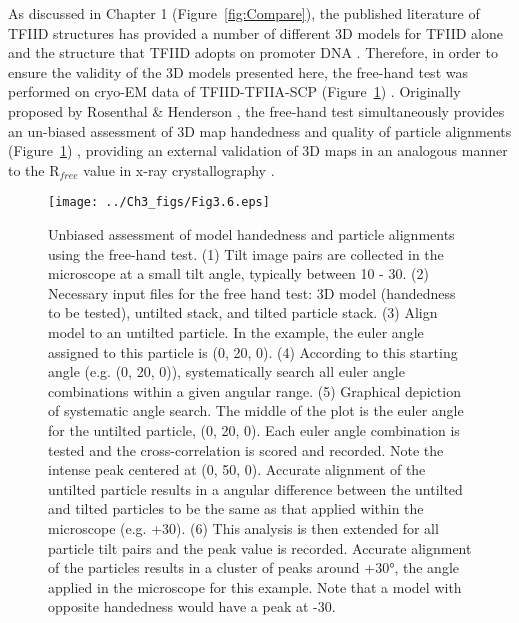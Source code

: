 As discussed in Chapter 1 (Figure~\ref{fig:Compare}), the published literature of TFIID structures has provided a number of different 3D models for TFIID alone \cite{Elmlund_691,Leurent_1554,Leurent_1797,Papai_539} and the structure that TFIID adopts on promoter DNA \cite{Elmlund_691,Papai_418}. Therefore, in order to ensure the validity of the 3D models presented here, the free-hand test was performed on cryo-EM data of TFIID-TFIIA-SCP  (Figure~\ref{fig:Fig3.6}) \cite{Rosenthal_2003}. Originally proposed by Rosenthal \& Henderson \cite{Rosenthal_2003}, the free-hand test simultaneously provides an un-biased assessment of 3D map handedness and quality of particle alignments (Figure~\ref{fig:Fig3.6}) \cite{Baker_2012,Henderson_2011,Lau_2010,Rosenthal_2003}, providing an external validation of 3D maps in an analogous manner to the R$_{free}$ value in x-ray crystallography \cite{Brunger_1992}. \\
\begin{figure}
\centering
\texttt{[image: ../Ch3\_figs/Fig3.6.eps]}
\caption[Unbiased assessment of model handedness and particle alignments using the free-hand test]{Unbiased assessment of model handedness and particle alignments using the free-hand test. (1) Tilt image pairs are collected in the microscope at a small tilt angle, typically between 10 - 30\textdegree. (2) Necessary input files for the free hand test:  3D model (handedness to be tested), untilted stack, and tilted particle stack. (3) Align model to an untilted particle.  In the example, the euler angle assigned to this particle is (0, 20, 0). (4) According to this starting angle (e.g. (0, 20, 0)), systematically search all euler angle combinations within a given angular range.  (5) Graphical depiction of systematic angle search.  The middle of the plot is the euler angle for the untilted particle, (0, 20, 0).  Each euler angle combination is tested and the cross-correlation is scored and recorded. Note the intense peak centered at (0, 50, 0). Accurate alignment of the untilted particle results in a angular difference between the untilted and tilted particles to be the same as that applied within the microscope (e.g. +30\textdegree). (6) This analysis is then extended for all particle tilt pairs and the peak value is recorded. Accurate alignment of the particles results in a cluster of peaks around +30°, the angle applied in the microscope for this example. Note that a model with opposite handedness would have a peak at -30\textdegree.}
\label{fig:Fig3.6}
\end{figure} 
 
